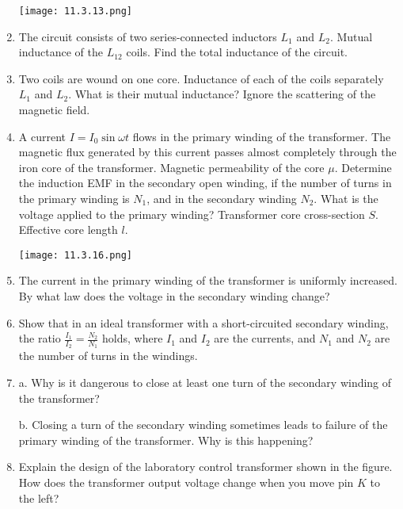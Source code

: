 \documentclass{article}
\begin{document}
\begin{enumerate}[label=11.3.\arabic*]
\begin{center}
    \texttt{[image: 11.3.13.png]}
\end{center}

\item The circuit consists of two series-connected inductors $L_1$ and $L_2$. Mutual inductance of the $L_{12}$ coils. Find the total inductance of the circuit.

\item Two coils are wound on one core. Inductance of each of the coils separately $L_1$ and $L_2$. What is their mutual inductance? Ignore the scattering of the magnetic field.

\item A current $I = I_0 \sin \omega t$ flows in the primary winding of the transformer. The magnetic flux generated by this current passes almost completely through the iron core of the transformer. Magnetic permeability of the core $\mu$. Determine the induction EMF in the secondary open winding, if the number of turns in the primary winding is $N_1$, and in the secondary winding $N_2$. What is the voltage applied to the primary winding? Transformer core cross-section $S$. Effective core length $l$.

\begin{center}
    \texttt{[image: 11.3.16.png]}
\end{center}

\item The current in the primary winding of the transformer is uniformly increased. By what law does the voltage in the secondary winding change?

\item Show that in an ideal transformer with a short-circuited secondary winding, the ratio $\frac{I_1}{I_2} = \frac{N_2}{N_1}$ holds, where $I_1$ and $I_2$ are the currents, and $N_1$ and $N_2$ are the number of turns in the windings.

\item a. Why is it dangerous to close at least one turn of the secondary winding of the transformer? 

b. Closing a turn of the secondary winding sometimes leads to failure of the primary winding of the transformer. Why is this happening?

\item Explain the design of the laboratory control transformer shown in the figure. How does the transformer output voltage change when you move pin $K$ to the left?


\end{enumerate}
\end{document}
